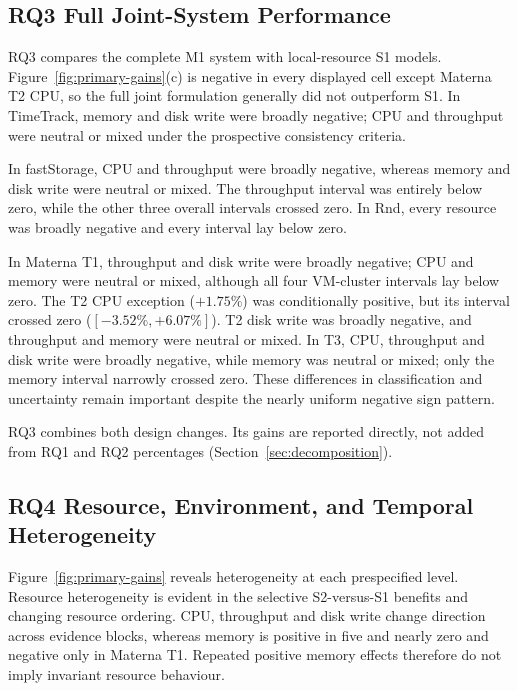 \documentclass[a4paper,fleqn]{cas-dc}
\begin{document}
\subsection{RQ3 Full Joint-System Performance}
\label{sec:results-rq3}

RQ3 compares the complete M1 system with local-resource S1 models.
Figure~\ref{fig:primary-gains}(c) is negative in every displayed cell except
Materna T2 CPU, so the full joint formulation generally did not outperform S1.
In TimeTrack, memory and disk write were broadly negative; CPU and throughput
were neutral or mixed under the prospective consistency criteria.

In fastStorage, CPU and throughput were broadly negative, whereas memory and
disk write were neutral or mixed. The throughput interval was entirely below
zero, while the other three overall intervals crossed zero. In Rnd, every
resource was broadly negative and every interval lay below zero.

In Materna T1, throughput and disk write were broadly negative; CPU and memory
were neutral or mixed, although all four VM-cluster intervals lay below zero.
The T2 CPU exception ($+1.75\%$) was conditionally positive, but its interval
crossed zero ($[-3.52\%,+6.07\%]$). T2 disk write was broadly negative, and
throughput and memory were neutral or mixed. In T3, CPU, throughput and disk
write were broadly negative, while memory was neutral or mixed; only the
memory interval narrowly crossed zero. These differences in classification
and uncertainty remain important despite the nearly uniform negative sign
pattern.

RQ3 combines both design changes. Its gains are reported directly, not added
from RQ1 and RQ2 percentages (Section~\ref{sec:decomposition}).

\subsection{RQ4 Resource, Environment, and Temporal Heterogeneity}
\label{sec:results-rq4}

Figure~\ref{fig:primary-gains} reveals heterogeneity at each prespecified
level. Resource heterogeneity is evident in the selective S2-versus-S1
benefits and changing resource ordering. CPU, throughput and disk write change
direction across evidence blocks, whereas memory is positive in five and
nearly zero and negative only in Materna T1. Repeated positive memory effects
therefore do not imply invariant resource behaviour.
\end{document}
